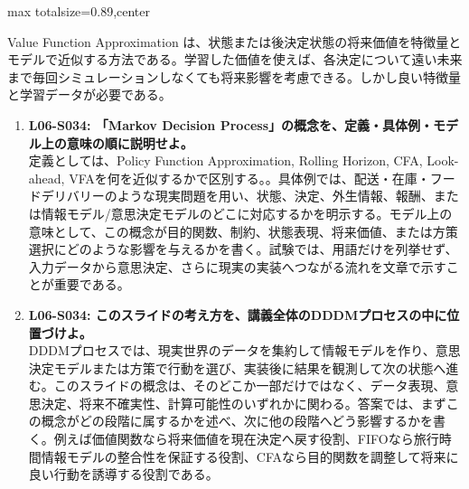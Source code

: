 \begin{minipage}[t]{0.58\textwidth}
\begin{adjustbox}{max totalsize={\textwidth}{0.89\textheight},center}
\begin{minipage}{\textwidth}
Value Function Approximation は、状態または後決定状態の将来価値を特徴量とモデルで近似する方法である。学習した価値を使えば、各決定について遠い未来まで毎回シミュレーションしなくても将来影響を考慮できる。しかし良い特徴量と学習データが必要である。\par{}\begin{enumerate}\item \textbf{L06-S034: 「Markov Decision Process」の概念を、定義・具体例・モデル上の意味の順に説明せよ。}\\定義としては、Policy Function Approximation, Rolling Horizon, CFA, Look-ahead, VFAを何を近似するかで区別する。。具体例では、配送・在庫・フードデリバリーのような現実問題を用い、状態、決定、外生情報、報酬、または情報モデル/意思決定モデルのどこに対応するかを明示する。モデル上の意味として、この概念が目的関数、制約、状態表現、将来価値、または方策選択にどのような影響を与えるかを書く。試験では、用語だけを列挙せず、入力データから意思決定、さらに現実の実装へつながる流れを文章で示すことが重要である。\item \textbf{L06-S034: このスライドの考え方を、講義全体のDDDMプロセスの中に位置づけよ。}\\DDDMプロセスでは、現実世界のデータを集約して情報モデルを作り、意思決定モデルまたは方策で行動を選び、実装後に結果を観測して次の状態へ進む。このスライドの概念は、そのどこか一部だけではなく、データ表現、意思決定、将来不確実性、計算可能性のいずれかに関わる。答案では、まずこの概念がどの段階に属するかを述べ、次に他の段階へどう影響するかを書く。例えば価値関数なら将来価値を現在決定へ戻す役割、FIFOなら旅行時間情報モデルの整合性を保証する役割、CFAなら目的関数を調整して将来に良い行動を誘導する役割である。\end{enumerate}
\end{minipage}
\end{adjustbox}
\end{minipage}


